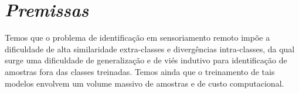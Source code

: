 






\section{\textit{Premissas}}\label{sec:Cap3_Premissas}

Temos que o problema de identificação em sensoriamento remoto impõe a dificuldade de alta similaridade extra-classes e divergências intra-classes, da qual surge uma dificuldade de generalização e de viés indutivo para identificação de amostras fora das classes treinadas. Temos ainda que o treinamento de tais modelos envolvem um volume massivo de amostras e de custo computacional. 



